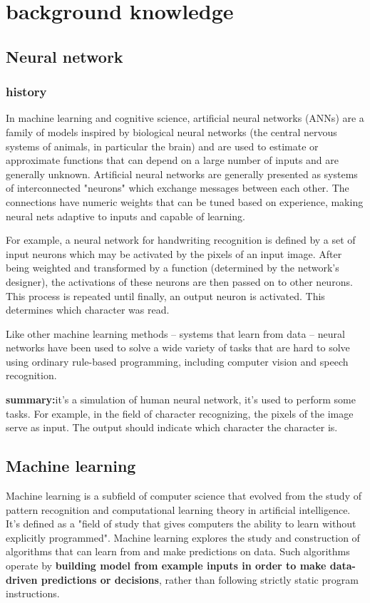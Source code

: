 \section{background knowledge}
\subsection{Neural network}
\subsubsection{history}
In machine learning and cognitive science, artificial neural networks (ANNs) are a family of models inspired by biological neural networks (the central nervous systems of animals, in particular the brain) and are used to estimate or approximate functions that can depend on a large number of inputs and are generally unknown. Artificial neural networks are generally presented as systems of interconnected "neurons" which exchange messages between each other. The connections have numeric weights that can be tuned based on experience, making neural nets adaptive to inputs and capable of learning.

For example, a neural network for handwriting recognition is defined by a set of input neurons which may be activated by the pixels of an input image. After being weighted and transformed by a function (determined by the network's designer), the activations of these neurons are then passed on to other neurons. This process is repeated until finally, an output neuron is activated. This determines which character was read.

Like other machine learning methods – systems that learn from data – neural networks have been used to solve a wide variety of tasks that are hard to solve using ordinary rule-based programming, including computer vision and speech recognition.

\textbf{summary:}it's a simulation of human neural network, it's used to perform some tasks. For example, in the field of character recognizing, the pixels of the image serve as input. The output should indicate which character the character is.
\subsection{Machine learning}
Machine learning is a subfield of computer science that evolved from the study of pattern recognition and computational learning theory in artificial intelligence. It's defined as a "field of study that gives computers the ability to learn without explicitly programmed". Machine learning explores the study and construction of algorithms that can learn from and make predictions on data. Such algorithms operate by \textbf{building model from example inputs in order to make data-driven predictions or decisions}, rather than following strictly static program instructions.

